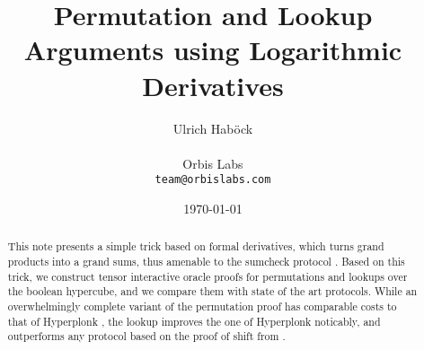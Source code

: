 \documentclass[11pt]{article}
\author{%
Ulrich Hab{\"o}ck
\\\\
Orbis Labs
\\
\texttt{team@orbislabs.com}
}
\theoremstyle{definition}
\theoremstyle{remark}
\begin{document}
\title{%
Permutation and Lookup Arguments using 
Logarithmic Derivatives  
}
\date{%
\today
}
\maketitle



\begin{abstract}
This note presents a simple trick based on formal derivatives, which turns grand products into a grand sums, thus amenable to the  sumcheck protocol \cite{sumcheck}.
Based on this trick, we construct tensor interactive oracle proofs for permutations and lookups over the boolean hypercube, and we compare them with state of the art protocols.
While an overwhelmingly complete variant of the permutation proof has comparable costs to that of Hyperplonk \cite{Hyperplonk},  the lookup improves the one of Hyperplonk noticably, and outperforms any protocol based on the proof of shift from \cite{TensorR1CS}.
%
\end{abstract}


 \tableofcontents

\end{document}
